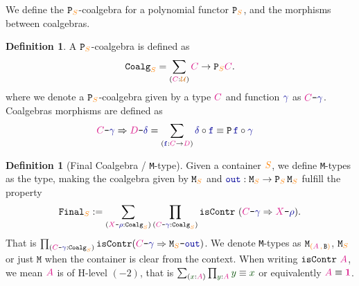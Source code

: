 \documentclass[twoside,11pt,openright]{report}
\theoremstyle{plain} %
\theoremstyle{definition}
\newtheorem{defn}[thm]{Definition}%
\theoremstyle{remark}
\newcommand*{\term}[1]{\textcolor{green!30!black}{#1}} %
\newcommand*{\type}[1]{\textcolor{magenta!90!black}{#1}}
\newcommand*{\container}[1]{\textcolor{orange}{#1}}
\newcommand*{\containerpair}[2]{\ensuremath{\colorlet{savedleftcolor}{.}\color{orange}\left(\color{savedleftcolor}#1\,\textcolor{orange}{\mathbf{,}}\,#2\color{orange}\right)\color{savedleftcolor}}}
\newcommand*{\universe}[1]{\textcolor{orange!80!black}{#1}}
\newcommand*{\unit}{\type{\textbf{1}}}
\newcommand*{\coalg}[2]{#1\texttt{-}#2}
\newcommand*{\function}[1]{\textcolor{blue!60!black}{\ensuremath{\mathtt{#1}}}}
\newcommand*{\typeformer}[1]{\ensuremath{\mathtt{#1}}}
\newcommand*{\functor}[1]{\ensuremath{\mathbf{\mathtt{#1}}}}
\begin{document}
\noindent We define the \(\functor{P}_{\container{S}}\)-coalgebra for a polynomial functor \(\functor{P}_{\container{S}}\), and the morphisms between coalgebras.
\begin{defn}
  A \(\functor{P}_{\container{S}}\)-coalgebra is defined as
  \begin{equation}
    \typeformer{Coalg}_{\container{S}} = \sum_{(\type{C} : \universe{\mathcal{U}})} \type{C} \rightarrow \functor{P}_{\container{S}}\type{C}.
  \end{equation}
  where we denote a \(\functor{P}_{\container{S}}\)-coalgebra given by a type \(\type{C}\) and function \(\function{\gamma}\) as \(\coalg{\type{C}}{\function{\gamma}}\). Coalgebras morphisms are defined as
  \begin{equation}
    \begin{aligned}
      \coalg{\type{C}}{\function{\gamma}} \Rightarrow \coalg{\type{D}}{\function{\delta}} &= \sum_{(\function{f} : \type{C} \rightarrow \type{D})} \function{\delta} \circ \function{f} \equiv \functor{P}\,\function{f} \circ \function{\gamma}
    \end{aligned}
  \end{equation}
\end{defn}
\begin{defn}[Final Coalgebra / \texttt{M}-type]
  \label{defn:M-type-final-def}
  Given a container \(\container{S}\), we define \texttt{M}-types as the type, making the coalgebra given by \(\typeformer{M}_{\container{S}}\) and \(\function{out} : \typeformer{M}_{\container{S}} \rightarrow \functor{P}_{\container{S}}\,\typeformer{M}_{\container{S}}\) fulfill the property
  \begin{equation}
    \typeformer{Final}_{\container{S}} := \sum_{(\coalg{\type{X}}{\function{\rho}} : \mathtt{Coalg}_{\container{S}})} \prod_{(\coalg{\type{C}}{\function{\gamma}} : \mathtt{Coalg}_{\container{S}})} \mathtt{isContr}~(\coalg{\type{C}}{\function{\gamma}} \Rightarrow \coalg{\type{X}}{\function{\rho}}).
  \end{equation}
  That is \(\prod_{(\coalg{\type{C}}{\function{\gamma}} : \mathtt{Coalg}_{\container{S}})} \mathtt{isContr}(\coalg{\type{C}}{\function{\gamma}} \Rightarrow \coalg{\typeformer{M}_{\container{S}}}{\function{out}})\). We denote \texttt{M}-types as \(\typeformer{M}_{\containerpair{\type{A}}{\typeformer{B}}}\), \(\typeformer{M}_{\container{S}}\) or just \(\typeformer{M}\) when the container is clear from the context. When writing \(\mathtt{isContr}~\type{A}\), we mean \(\type{A}\) is of H-level \((-2)\), that is \(\sum_{(\term{x} : \type{A})} \prod_{\term{y} : \type{A}} \term{y} \equiv \term{x}\) or equivalently \(\type{A} \equiv \unit\).
\end{defn}
\end{document}
